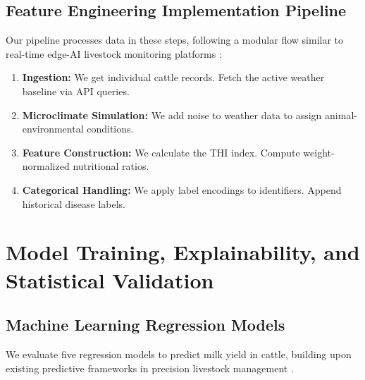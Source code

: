 \documentclass[conference]{IEEEtran}
\begin{document}
	\subsection{Feature Engineering Implementation Pipeline}
	Our pipeline processes data in these steps, following a modular flow similar to real-time edge-AI livestock monitoring platforms \cite{ref9, ref10}:
	
	\begin{enumerate}
		\item \textbf{Ingestion:} We get individual cattle records. Fetch the active weather baseline via API queries.
		
		\item \textbf{Microclimate Simulation:} We add noise to weather data to assign animal-environmental conditions.
		
		\item \textbf{Feature Construction:} We calculate the THI index. Compute weight-normalized nutritional ratios.
		
		\item \textbf{Categorical Handling:} We apply label encodings to identifiers. Append historical disease labels.
	\end{enumerate}
	
	\section{Model Training, Explainability, and Statistical Validation}
	
	\subsection{Machine Learning Regression Models}
	We evaluate five regression models to predict milk yield in cattle, building upon existing predictive frameworks in precision livestock management \cite{ref4, ref5}.
	
\end{document}
